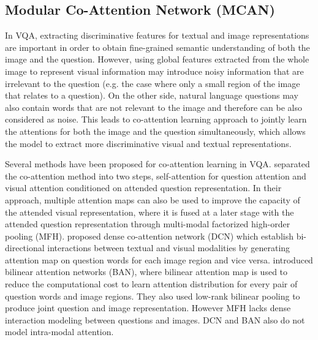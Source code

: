 \documentclass{article}
\begin{document}
\subsection{Modular Co-Attention Network (MCAN)}
In VQA, extracting discriminative features for textual and image representations are important in order to obtain fine-grained semantic understanding of both the image and the question. However, using global features extracted from the whole image to represent visual information may introduce noisy information that are irrelevant to the question (e.g. the case where only a small region of the image that relates to a question). On the other side, natural language questions may also contain words that are not relevant to the image and therefore can be also considered as noise. This leads to co-attention learning approach to jointly learn the attentions for both the image and the question simultaneously, which allows the model to extract more discriminative visual and textual representations. 

Several methods have been proposed for co-attention learning in VQA. \citet{yu2018beyond} separated the co-attention method into two steps, self-attention for question attention and visual attention conditioned on attended question representation. In their approach, multiple attention maps can also be used to improve the capacity of the attended visual representation, where it is fused at a later stage with the attended question representation through multi-modal factorized high-order pooling (MFH). \citet{Nguyen_2018_CVPR} proposed dense co-attention network (DCN) which establish bi-directional interactions between textual and visual modalities by generating attention map on question words for each image region and vice versa. \citet{ban} introduced bilinear attention networks (BAN), where bilinear attention map is used to reduce the computational cost to learn attention distribution for every pair of question words and image regions. They also used low-rank bilinear pooling to produce joint question and image representation. However MFH lacks dense interaction modeling between questions and images. DCN and BAN also do not model intra-modal attention.
\end{document}
